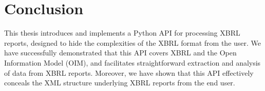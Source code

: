 \chapter{Conclusion}
\label{chapter:conclusion}


This thesis introduces and implements a Python API for processing XBRL reports, designed to hide the complexities of the XBRL format from the user.
We have successfully demonstrated that this API covers XBRL and the Open Information Model (OIM),
and facilitates straightforward extraction and analysis of data from XBRL reports.
Moreover, we have shown that this API effectively conceals the XML structure underlying XBRL reports from the end user.


